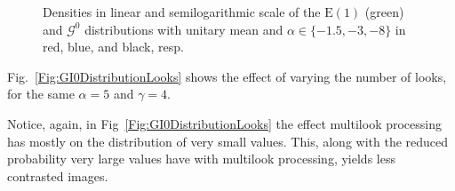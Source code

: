 \documentclass{beamer}
\begin{document}
\begin{frame}
\begin{figure}[hbt]
\centering
{}
\caption[Densities in linear and semilogarithmic scale of the $\text{E}(1)$ (green) and $\mathcal G^0$ distributions with unitary mean]{Densities in linear and semilogarithmic scale of the $\text{E}(1)$ (green) and $\mathcal G^0$ distributions with unitary mean and $\alpha\in\{-1.5,-3,-8\}$ in red, blue, and black, resp.}\label{Fig:GI0Distribution}
\end{figure}
\end{frame}


\begin{frame}
Fig.~\ref{Fig:GI0DistributionLooks} shows the effect of varying the number of looks, for the same $\alpha=5$ and $\gamma=4$.

Notice, again, in Fig~\ref{Fig:GI0DistributionLooks} the effect multilook processing has mostly on the distribution of very small values.
This, along with the reduced probability very large values have with multilook processing, yields less contrasted images.
\end{frame}
\end{document}
